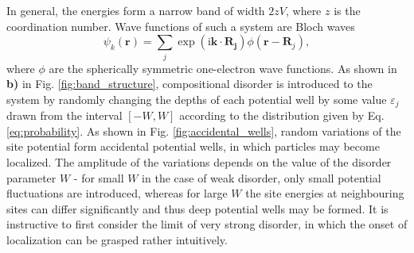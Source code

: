 \documentclass[10pt,a4paper]{article}
\begin{document}
In general, the energies form a narrow band of width $2zV$, where $z$ is the coordination number. Wave functions of such a system are Bloch waves  
\begin{equation}\label{eq:Bloch}
\psi_k(\mathbf{r})= \sum_j\exp(\mathrm{i}\mathbf{k}\cdot\mathbf{R_j})\phi(\mathbf{r}-\mathbf{R}_j),
\end{equation}
where $\phi$ are the spherically symmetric one-electron wave functions. As shown in \textbf{b)} in Fig. \ref{fig:band_structure}, compositional disorder is introduced to the system by randomly changing the depths of each potential well by some value $\varepsilon_j$ drawn from the interval $[-W,W]$ according to the distribution given by Eq. \eqref{eq:probability}. As shown in Fig. \ref{fig:accidental_wells}, random variations of the site potential form accidental potential wells, in which particles may become localized. The amplitude of the variations depends on the value of the disorder parameter $W$ - for small $W$ in the case of weak disorder, only small potential fluctuations are introduced, whereas for large $W$ the site energies at neighbouring sites can differ significantly and thus deep potential wells may be formed. It is instructive to first consider the limit of very strong disorder, in which the onset of localization can be grasped rather intuitively.\\\\
\end{document}
